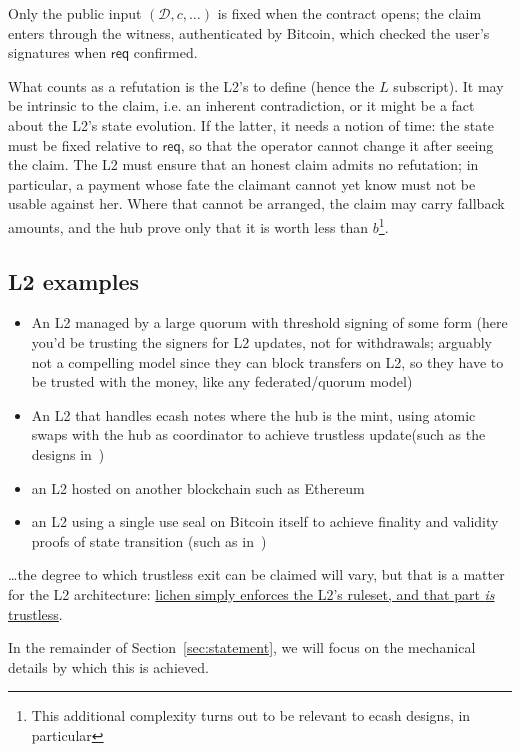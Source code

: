 \documentclass[11pt]{article}
\begin{document}
Only the public
input $(\mathcal{D}, c, \ldots)$ is fixed when the contract opens; the claim
enters through the witness, authenticated by Bitcoin, which checked the user's
signatures when $\mathsf{req}$ confirmed.

What counts as a refutation is the L2's to define (hence the $L$ subscript). It may be intrinsic to the
claim, i.e. an inherent contradiction, or it might be a fact about the L2's state evolution. If the latter, it needs a notion of time: the state must be fixed relative to
$\mathsf{req}$, so that the operator cannot change it after seeing the claim.
The L2 must ensure that an honest claim admits no refutation; in particular,
a payment whose fate the claimant cannot yet know must not be usable against
her. Where that cannot be arranged, the claim may carry fallback amounts, and
the hub prove only that it is worth less than $b$\footnote{This additional complexity turns out to be relevant to ecash designs, in particular}.

\subsection{L2 examples}

\begin{itemize}
\item An L2 managed by a large quorum with threshold signing of some form (here you'd be trusting the signers for L2 updates, not for withdrawals; arguably not a compelling model since they can block transfers on L2, so they have to be trusted with the money, like any federated/quorum model)
\item An L2 that handles ecash notes where the hub is the mint, using atomic swaps with the hub as coordinator to achieve trustless update(such as the designs in~\cite{lichenecash, glichen})
\item an L2 hosted on another blockchain such as Ethereum
\item an L2 using a single use seal on Bitcoin itself to achieve finality and validity proofs of state transition (such as in~\cite{lichenl2})
\end{itemize}

\ldots the degree to which trustless exit can be claimed will vary, but that is a matter for the L2 architecture: \underline{lichen simply enforces the L2's ruleset, and that part \emph{is} trustless}.

In the remainder of Section~\ref{sec:statement}, we will focus on the mechanical details by which this is achieved.
\end{document}

